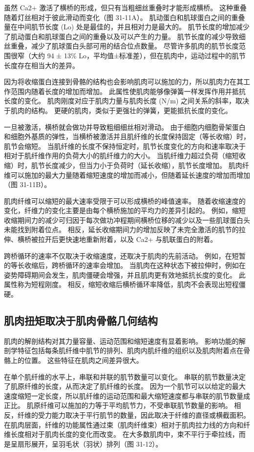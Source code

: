 虽然 Ca2+ 激活了横桥的形成，但只有当粗细丝重叠时才能形成横桥。 这种重叠随着灯丝相对于彼此滑动而变化（图 31-11A）。 肌动蛋白和肌球蛋白之间的重叠量在中间肌节长度 (Lo) 处是最佳的，并且相对力是最大的。 肌节长度的增加减少了肌动蛋白和肌球蛋白之间的重叠以及可以产生的力量。 肌节长度的减少导致细丝重叠，减少了肌球蛋白头部可用的结合位点数量。 尽管许多肌肉的肌节长度范围很窄（大约 94 ± 13\% Lo，平均值±标准差），但在肌肉中，运动过程中的肌节长度存在相当大的差异。

因为将收缩蛋白连接到骨骼的结构也会影响肌肉可以施加的力，所以肌肉力在其工作范围内随着长度的增加而增加。 此属性使肌肉能够像弹簧一样发挥作用并抵抗长度的变化。 肌肉刚度对应于肌肉力量与肌肉长度 (N/m) 之间关系的斜率，取决于肌肉的结构。 更硬的肌肉，类似于更强壮的弹簧，更能抵抗长度的变化。

一旦被激活，横桥就会做功并导致粗细细丝相对滑动。 由于细胞内细胞骨架蛋白和细胞外基质的弹性，当横桥被激活并且肌纤维的长度保持固定（等长收缩）时，肌节会缩短。 当肌纤维的长度不保持恒定时，肌节长度变化的方向和速率取决于相对于肌纤维作用的负荷大小的肌纤维力的大小。 当肌纤维力超过负荷（缩短收缩）时，肌节长度减少，但当力小于负荷时（延长收缩），肌节长度增加。 肌肉纤维可以施加的最大力量随着缩短速度的增加而减小，但随着延长速度的增加而增加（图 31-11B）。

肌肉纤维可以缩短的最大速率受限于可以形成横桥的峰值速率。 随着收缩速度的变化，纤维力的变化主要是由每个横桥施加的平均力的差异引起的。 例如，缩短收缩期间力的减少可归因于每次做功冲程期间横桥位移的减少以及一些肌球蛋白头未能找到附着位点。 相反，延长收缩期间力的增加反映了未完全激活的肌节的拉伸、横桥被拉开后更快速地重新附着，以及 Ca2+ 与肌联蛋白的附着。

跨桥循环的速率不仅取决于收缩速度，还取决于肌肉的先前活动。 例如，在短暂的等长收缩后，跨桥循环的速率会增加。 当肌肉在这种状态下被拉伸时，例如在姿势障碍期间会发生，肌肉僵硬会增强，并且肌肉更有效地抵抗长度的变化。 此属性称为短程刚度。 相反，缩短收缩后横桥循环率降低，肌肉不会表现出短程僵硬。

\subsection{肌肉扭矩取决于肌肉骨骼几何结构}
肌肉的解剖结构对其力量容量、运动范围和缩短速度有显着影响。 影响功能的解剖学特征包括每条肌纤维中肌节的排列、肌肉内肌纤维的组织以及肌肉附着点在骨骼上的位置。 这些特征在肌肉之间差异很大。

在单个肌纤维的水平上，串联和并联的肌节数量可以变化。 串联的肌节数量决定了肌原纤维的长度，从而决定了肌纤维的长度。 因为一个肌节可以以给定的最大速度缩短一定长度，所以肌纤维的运动范围和最大缩短速度都与串联的肌节数量成正比。 肌原纤维可以施加的力等于平均肌节力，不受串联肌节数量的影响。 相反，纤维的受力能力取决于平行肌节的数量，因此取决于纤维的直径或横截面积。 在肌肉层面，纤维的功能属性通过束（肌肉纤维束）相对于肌肉拉力线的方向和纤维长度相对于肌肉长度的变化而改变。 在大多数肌肉中，束不平行于牵拉线，而是呈扇形展开，呈羽毛状（羽状）排列（图 31-12）。

